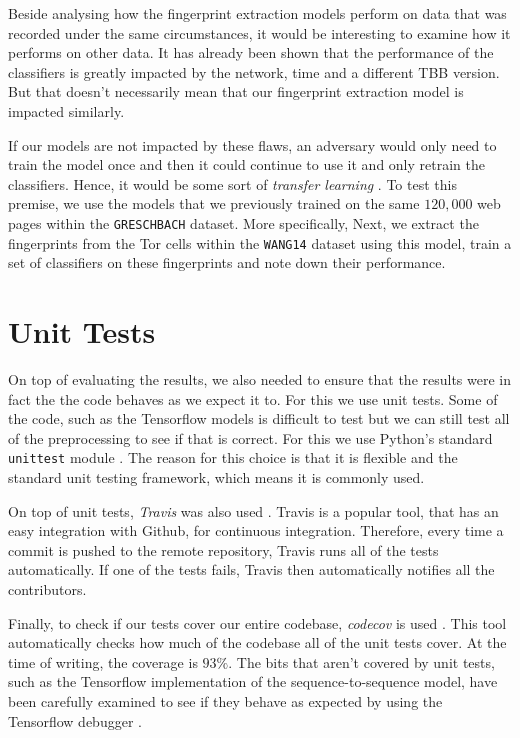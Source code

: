 Beside analysing how the fingerprint extraction models perform on data that was recorded under the same circumstances, it would be interesting to examine how it performs on other data.
It has already been shown that the performance of the classifiers is greatly impacted by the network, time and a different TBB version.
But that doesn't necessarily mean that our fingerprint extraction model is impacted similarly.

If our models are not impacted by these flaws, an adversary would only need to train the model once and then it could continue to use it and only retrain the classifiers.
Hence, it would be some sort of \textit{transfer learning}
.
To test this premise, we use the models that we previously trained on the same $120,000$ web pages within the \texttt{GRESCHBACH} dataset.
More specifically, %
Next, we extract the fingerprints from the Tor cells within the \texttt{WANG14} dataset using this model, train a set of classifiers on these fingerprints and note down their performance.




\section{Unit Tests}

On top of evaluating the results, we also needed to ensure that the results were in fact the the code behaves as we expect it to.
For this we use unit tests.
Some of the code, such as the Tensorflow models is difficult to test but we can still test all of the preprocessing to see if that is correct.
For this we use Python's standard \texttt{unittest} module \cite{python_unittest_documentation}.
The reason for this choice is that it is flexible and the standard unit testing framework, which means it is commonly used.

On top of unit tests, \textit{Travis} was also used \cite{travis}.
Travis is a popular tool, that has an easy integration with Github, for continuous integration.
Therefore, every time a commit is pushed to the remote repository, Travis runs all of the tests automatically.
If one of the tests fails, Travis then automatically notifies all the contributors.

Finally, to check if our tests cover our entire codebase, \textit{codecov} is used \cite{codecov}.
This tool automatically checks how much of the codebase all of the unit tests cover.
At the time of writing, the coverage is $93\%$.
The bits that aren't covered by unit tests, such as the Tensorflow implementation of the sequence-to-sequence model, have been carefully examined to see if they behave as expected by using the Tensorflow debugger \cite{tensorflow}.
